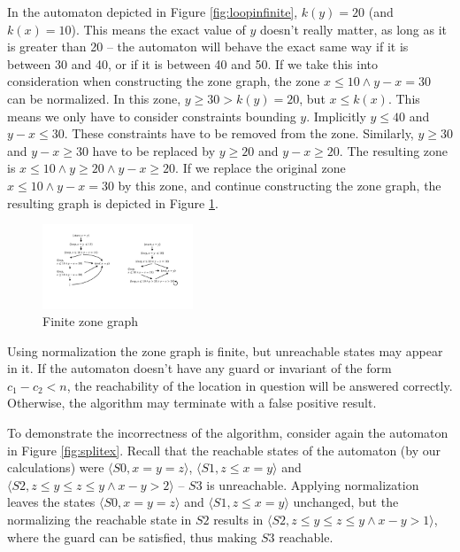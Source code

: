 \begin{example}
In the automaton depicted in Figure \ref{fig:loopinfinite}, $k(y)=20$ (and $k(x)=10$). This means the exact value of $y$ doesn't really matter, as long as it is greater than 20 -- the automaton will behave the exact same way if it is between 30 and 40, or if it is between 40 and 50. %
If we take this into consideration when constructing the zone graph, the zone  $x \leq 10 \wedge y-x=30$ can be normalized. In this zone, $y \geq 30 > k(y)=20$, but $x \leq k(x)$. This means we only have to consider constraints bounding $y$.
Implicitly $y \leq 40$ and $y-x \leq 30$. These constraints have to be removed from the zone. Similarly, $y \geq 30$ and $y-x \geq 30$ have to be replaced by $y \geq 20$ and $y-x \geq 20$. The resulting zone is $x \leq 10 \wedge y \geq 20 \wedge y-x \geq 20$. If we replace the original zone  $x \leq 10 \wedge y-x=30$ by this zone, and continue constructing the zone graph, the resulting graph is depicted in Figure \ref{fig:looprealgraph}.

\end{example}

\begin{figure}
	\centering
	\includegraphics [width=0.4\textwidth] {include/figures/loop_finite_zonegraph}
			\vspace*{4pt}%
	\caption{Finite zone graph}
	\label{fig:looprealgraph}
\end{figure}

Using normalization the zone graph is finite, but unreachable states may appear in it. If the automaton doesn't have any guard or invariant of the form $c_1 - c_2 < n$, the reachability of the location in question will be answered correctly. Otherwise, the algorithm may terminate with a false positive result.

\begin{example}
	To demonstrate the incorrectness of the algorithm, consider again the automaton in Figure \ref{fig:splitex}. Recall that the reachable states of the automaton (by our calculations) were $\langle S0,x=y=z \rangle$, $\langle S1,z \leq x=y \rangle$ and $\langle S2,z \leq y \leq z \leq y \wedge x-y > 2\rangle$ -- $S3$ is unreachable. Applying normalization leaves the states $\langle S0,x=y=z \rangle$ and $\langle S1,z \leq x=y \rangle$ unchanged, but the normalizing the reachable state in $S2$ results in $\langle S2,z \leq y \leq z \leq y \wedge x-y > 1\rangle$, where the guard can be satisfied, thus making $S3$ reachable.
\end{example}


